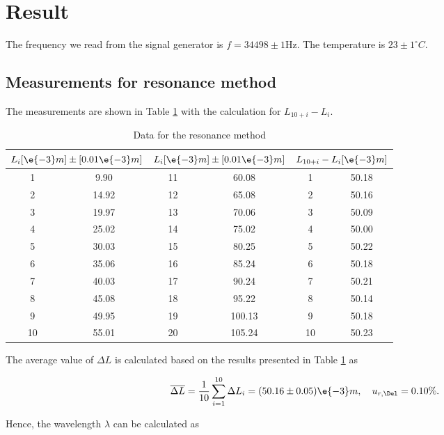\section{Result}

The frequency we read from the signal generator is $f=34498 \pm 1$Hz. The
temperature is $23 \pm 1 ^\circ C$.

\subsection{Measurements for resonance method}

The measurements are shown in Table \ref{data_res} with the calculation for $L_{10+i}-L_i$.

\begin{table}[H] \small
    \centering
    \begin{tabular}{|c|c|c|c|c|c|}
    \hline
        \multicolumn{2}{|c|}{$L_i[\e{-3}m]\pm[0.01\e{-3}m]$} & 
        \multicolumn{2}{|c|}{$L_i[\e{-3}m]\pm[0.01\e{-3}m]$} &
        \multicolumn{2}{|c|}{$L_{10+i}-L_i[\e{-3}m]$}\\\hline
        1 & 9.90 & 11 & 60.08 & 1 & 50.18 \\\hline
        2 & 14.92 & 12 & 65.08 & 2 & 50.16 \\\hline
        3 & 19.97 & 13 & 70.06 & 3 & 50.09 \\\hline
        4 & 25.02 & 14 & 75.02 & 4 & 50.00 \\\hline
        5 & 30.03 & 15 & 80.25 & 5 & 50.22 \\\hline
        6 & 35.06 & 16 & 85.24 & 6 & 50.18 \\\hline
        7 & 40.03 & 17 & 90.24 & 7 & 50.21 \\\hline
        8 & 45.08 & 18 & 95.22 & 8 & 50.14 \\\hline
        9 & 49.95 & 19 & 100.13 & 9 & 50.18 \\\hline
        10 & 55.01 & 20 & 105.24 & 10 & 50.23 \\\hline
    \end{tabular}
    \caption{Data for the resonance method}\label{data_res}
\end{table}

The average value of $\Delta L$ is calculated  based on the results presented in Table \ref{data_res} as

\[
    \overline{\Delta L}=\frac{1}{10}\sum_{i=1}^{10}\Delta L_i=(50.16\pm 0.05)\e{-3}m,\quad u_{r,\Del}=0.10\%.
\]

Hence, the wavelength $\lambda$ can be calculated as

